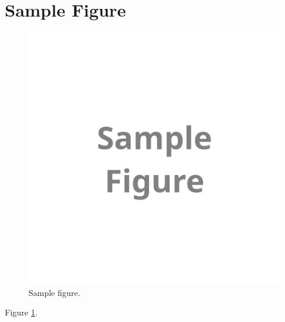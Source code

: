 
\section{Sample Figure}

\begin{figure}[!htb]
\includegraphics[width=\hsize]{./figures/fig_sample.png}
\caption{Sample figure.}
\label{fig_sample}
\end{figure}

Figure \ref{fig_sample}.
